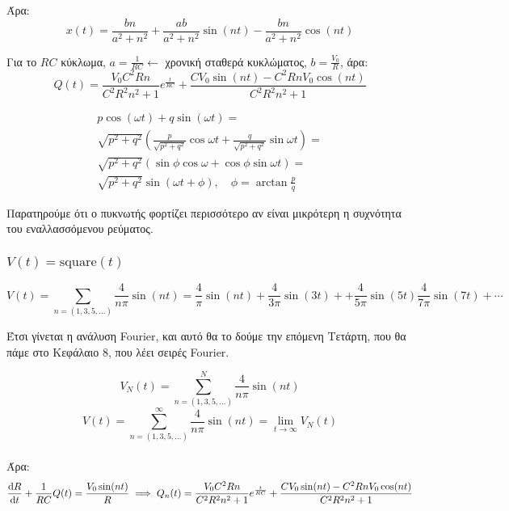 \documentclass[11pt,a4paper,titlepage,draft]{article}
\begin{document}
Άρα:
\[
x(t) = \frac{bn}{a^2+n^2} + \frac{ab}{a^2+n^2} \sin (nt) -  \frac{bn}{a^2+n^2} \cos (nt)
\]

Για το \(RC\) κύκλωμα, \(a=\frac{1}{RC} \leftarrow \) χρονική σταθερά κυκλώματος, \(b=\frac{V_0}{R}\), άρα:
\[
Q(t) = \frac{V_0C^2Rn}{C^2R^2n^2+1}e^{\frac{t}{RC}} + \frac{CV_0\sin (nt) - C^2RnV_0 \cos (nt)}{C^2R^2n^2+1}
\]

\begin{attnbox}{}
\begin{align*}
p \cos (\omega t) + q \sin (\omega t) = \\
\sqrt{p^2+q^2} \left( \frac{p}{\sqrt{p^2+q^2}} \cos \omega t+ \frac{q}{\sqrt{p^2+q^2}} \sin \omega t \right) = \\
\sqrt{p^2+q^2} \left ( \sin \phi \cos \omega + \cos \phi \sin \omega t \right) = \\
\sqrt{p^2+q^2} \sin ( \omega t + \phi ), \quad \phi = \arctan \frac{p}{q}
\end{align*}
\end{attnbox}

Παρατηρούμε ότι ο πυκνωτής φορτίζει περισσότερο αν είναι μικρότερη η συχνότητα του εναλλασσόμενου ρεύματος.

\subsubsection{\(V(t) = \mathrm{square}(t)\)}

\[
V(t)= \sum _{n = (1,3,5,\dots)} \frac{4}{n \pi} \sin (n t) =
\frac{4}{ \pi} \sin (n t) + \frac{4}{3 \pi} \sin (3 t) +
+ \frac{4}{5 \pi} \sin (5 t) \frac{4}{7 \pi} \sin (7 t) + \cdots
\]

Έτσι γίνεται η ανάλυση \textlatin{Fourier}, και αυτό θα το δούμε την επόμενη Τετάρτη, που θα πάμε στο Κεφάλαιο 8, που λέει σειρές \textlatin{Fourier}.

\[
V_N(t) = \sum _{n = (1,3,5,\dots)}^N \frac{4}{n \pi} \sin (n t)
\]
\[
V(t) = \sum _{n = (1,3,5,\dots)}^\infty \frac{4}{n \pi} \sin (n t) = \lim_{t \to \infty} V_N(t)
\]

\paragraph{}
Άρα:
\[
 \frac{\dif R}{\dif t}  + \frac{1}{RC}Q(t) = \frac{V_0 \sin (nt)}{R} \implies
 Q_n(t) = \frac{V_0C^2Rn}{C^2R^2n^2+1}e^{\frac{t}{RC}} + \frac{CV_0\sin (nt) - C^2RnV_0 \cos (nt)}{C^2R^2n^2+1}
\]
\end{document}
